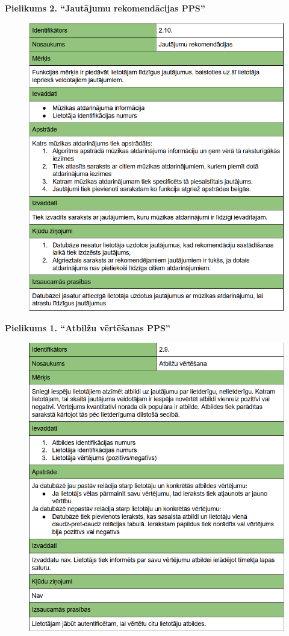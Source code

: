\documentclass[12pt]{article}
\begin{document}
\pagebreak

\centering \textbf{Pielikums 2. ``Jautājumu rekomendācijas PPS''}
\begin{figure}[H]
\begin{center}
	\includegraphics[scale=0.8]{Capture2.png}
	\label{fig:rekomendacijasPPS}
\end{center}
\end{figure}

\pagebreak

\centering \textbf{Pielikums 1. ``Atbilžu vērtēšanas PPS''}
\begin{figure}[H]
\begin{center}
	\includegraphics[scale=0.8]{Capture1.png}
	\label{fig:vertesanaPPS}
\end{center}
\end{figure}
\end{document}
